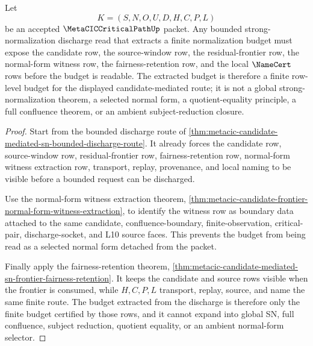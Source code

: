 \begin{theorem}
\label{thm:metacic-candidate-mediated-sn-budget-extraction}
Let
$$
K=(S,N,O,U,D,H,C,P,L)
$$
be an accepted $\MetaCICCriticalPathUp$ packet. Any bounded strong-normalization discharge read that extracts a finite normalization budget must expose the candidate row, the source-window row, the residual-frontier row, the normal-form witness row, the fairness-retention row, and the local $\NameCert$ rows before the budget is readable. The extracted budget is therefore a finite row-level budget for the displayed candidate-mediated route; it is not a global strong-normalization theorem, a selected normal form, a quotient-equality principle, a full confluence theorem, or an ambient subject-reduction closure.
\end{theorem}
\begin{proof}
Start from the bounded discharge route of \autoref{thm:metacic-candidate-mediated-sn-bounded-discharge-route}. It already forces the candidate row, source-window row, residual-frontier row, fairness-retention row, normal-form witness extraction row, transport, replay, provenance, and local naming to be visible before a bounded request can be discharged.

Use the normal-form witness extraction theorem, \autoref{thm:metacic-candidate-frontier-normal-form-witness-extraction}, to identify the witness row as boundary data attached to the same candidate, confluence-boundary, finite-observation, critical-pair, discharge-socket, and L10 source faces. This prevents the budget from being read as a selected normal form detached from the packet.

Finally apply the fairness-retention theorem, \autoref{thm:metacic-candidate-mediated-sn-frontier-fairness-retention}. It keeps the candidate and source rows visible when the frontier is consumed, while $H,C,P,L$ transport, replay, source, and name the same finite route. The budget extracted from the discharge is therefore only the finite budget certified by those rows, and it cannot expand into global SN, full confluence, subject reduction, quotient equality, or an ambient normal-form selector.
\end{proof}

